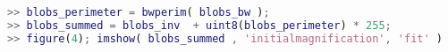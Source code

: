 \begin{lstlisting}[language=matlab]
>> blobs_perimeter = bwperim( blobs_bw );
>> blobs_summed = blobs_inv  + uint8(blobs_perimeter) * 255;
>> figure(4); imshow( blobs_summed , 'initialmagnification', 'fit' )

\end{lstlisting}